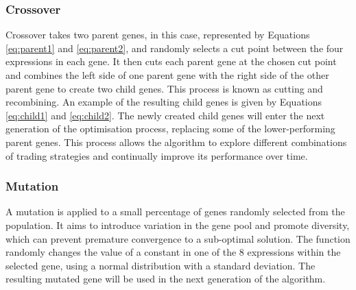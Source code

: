 \documentclass{IEEEtran}
\begin{document}
\subsubsection{Crossover}
Crossover takes two parent genes, in this case, represented by Equations \ref{eq:parent1} and \ref{eq:parent2}, and randomly selects a cut point between the four expressions in each gene. It then cuts each parent gene at the chosen cut point and combines the left side of one parent gene with the right side of the other parent gene to create two child genes. This process is known as cutting and recombining. An example of the resulting child genes is given by Equations \ref{eq:child1} and \ref{eq:child2}. The newly created child genes will enter the next generation of the optimisation process, replacing some of the lower-performing parent genes. This process allows the algorithm to explore different combinations of trading strategies and continually improve its performance over time.

\subsubsection{Mutation}
A mutation is applied to a small percentage of genes randomly selected from the population. It aims to introduce variation in the gene pool and promote diversity, which can prevent premature convergence to a sub-optimal solution. The function randomly changes the value of a constant in one of the 8 expressions within the selected gene, using a normal distribution with a standard deviation. The resulting mutated gene will be used in the next generation of the algorithm. 
\end{document}
